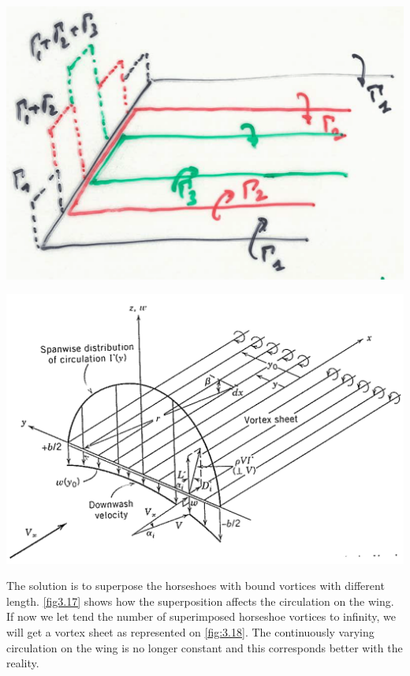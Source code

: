	\begin{center}
	\begin{minipage}{0.4\textwidth}
	\includegraphics[scale=0.15]{ch3/17}
	\label{fig:3.17}
	\end{minipage}
	\begin{minipage}{0.4\textwidth}
	\includegraphics[scale=0.12]{ch3/18}
	\label{fig:3.18}
	\end{minipage}
	\end{center}
	
	The solution is to superpose the horseshoes with bound vortices with different length. \autoref{fig3.17} shows how the superposition affects the circulation on the wing. If now we let tend the number of superimposed horseshoe vortices to infinity, we will get a vortex sheet as represented on \autoref{fig:3.18}. The continuously varying circulation on the wing is no longer constant and this corresponds better with the reality. 
	
